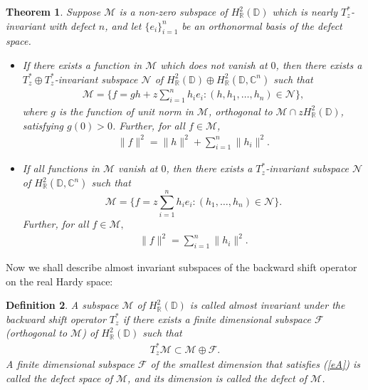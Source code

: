\documentclass[11pt]{amsart}
\newtheorem{theorem}{Theorem}[section]
\newtheorem{definition}[theorem]{Definition}
\numberwithin{equation}{section}
\begin{document}
\begin{theorem}\label{MT3}
Suppose $\mathcal{M}$ is a non-zero subspace of $H^2_{\mathbb{R}}(\mathbb{D})$ which is nearly $T^*_z$-invariant with defect $n$, and let $\{e_i\}_{i=1}^{n}$ be an orthonormal basis of the defect space. 
\begin{itemize}
    \item[(i)] If there exists a function in $\mathcal{M}$ which does not vanish at $0$, then there exists a $T^*_z\oplus T^*_z$-invariant subspace $\mathcal{N}$ of $H^2_{\mathbb{R}}(\mathbb{D}) \oplus H^2_{\mathbb{R}}(\mathbb{D},\mathbb{C}^n)$ such that
\begin{eqnarray*}
    \mathcal{M}=\Bigg\{f=gh + z\sum_{i=1}^{n}h_ie_i: (h, h_1, \dots, h_n) \in \mathcal{N}\Bigg\},
\end{eqnarray*}
where $g$ is the function of unit norm in $\mathcal{M}$, orthogonal to $\mathcal{M}\cap zH^2_{\mathbb{R}}(\mathbb{D})$, satisfying $g(0)>0$.
Further, for all $f \in \mathcal{M}$,
\begin{eqnarray*}
\|f\|^2=\|h\|^2 + \sum_{i=1}^{n}\|h_i\|^2.
\end{eqnarray*}
\item[(ii)] If all functions in $\mathcal{M}$ vanish at $0$, then there exists a $T^*_z$-invariant subspace $\mathcal{N}$ of $H^2_{\mathbb{R}}(\mathbb{D},\mathbb{C}^n)$ such that
$$\mathcal{M}=\Bigg\{f=z\sum_{i=1}^{n}h_ie_i :(h_1, \dots, h_n) \in \mathcal{N}\Bigg\}.$$
Further, for all $f\in \mathcal{M},$
\begin{eqnarray*}
    \|f\|^2=\sum_{i=1}^{n}\|h_i\|^2.
\end{eqnarray*}
\end{itemize}
\end{theorem}

\textnormal{Now we shall describe almost invariant subspaces of the backward shift operator on the real Hardy space:}

\begin{definition}\label{defA}
 A subspace $\mathcal{M}$ of $H^2_{\mathbb{R}}(\mathbb{D})$ is called almost invariant under the backward shift operator $T^*_z$ if there exists a finite dimensional subspace $\mathcal{F}$ (orthogonal to $\mathcal{M}$) of $H^2_{\mathbb{R}}(\mathbb{D})$ such that 
 \begin{eqnarray}\label{eA}
  T^*_z\mathcal{M} \subset \mathcal{M} \oplus \mathcal{F}.  
 \end{eqnarray}
A finite dimensional subspace $\mathcal{F}$ of the smallest dimension that satisfies (\ref{eA}) is called the \textit{defect space} of $\mathcal{M}$, and its dimension is called the \textit{defect} of $\mathcal{M}$. 
\end{definition}
\end{document}
